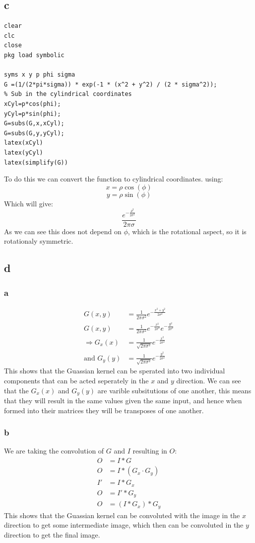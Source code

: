 \documentclass[11pt]{article}
\begin{document}
\subsection{c}
\label{sec:org69b491d}
\begin{verbatim}
clear
clc
close
pkg load symbolic

syms x y p phi sigma
G =(1/(2*pi*sigma)) * exp(-1 * (x^2 + y^2) / (2 * sigma^2));
% Sub in the cylindrical coordinates
xCyl=p*cos(phi);
yCyl=p*sin(phi);
G=subs(G,x,xCyl);
G=subs(G,y,yCyl);
latex(xCyl)
latex(yCyl)
latex(simplify(G))
\end{verbatim}
To do this we can convert the function to cylindrical coordinates. using:
\[x= \rho \cos{\left(\phi \right)}\]
\[y= \rho \sin{\left(\phi \right)}\]
Which will give:
\[\frac{e^{- \frac{\rho^{2}}{2 \sigma^{2}}}}{2 \pi \sigma}\]
As we can see this does not depend on \(\phi\), which is the rotational aspect, so it is rotationaly symmetric.
\subsection{d}
\label{sec:orgdaf4ac1}
\subsubsection{a}
\label{sec:org47fb13f}
\begin{align*}
G(x,y)&=\frac{1}{2\pi \sigma^{2}}e^{-\frac{x^2+y^2}{2 \sigma^2}} \\
G(x,y)&=\frac{1}{2\pi \sigma^{2}}e^{-\frac{x^2}{2 \sigma^2}}e^{-\frac{y^2}{2 \sigma^2}} \\
\Rightarrow G_x(x)&=\frac{1}{\sqrt{2\pi \sigma^{2}}}e^{-\frac{x^2}{2 \sigma^2}} \\
\textrm{and } G_y(y)&=\frac{1}{\sqrt{2\pi \sigma^{2}}}e^{-\frac{y^2}{2 \sigma^2}}
\end{align*}
This shows that the Guassian kernel can be sperated into two individual components that can be acted seperately in the \(x\) and \(y\) direction. We can see that the \(G_x(x)\) and \(G_y(y)\) are varible subsitutions of one another, this means that they will result in the same values given the same input, and hence when formed into their matrices they will be transposes of one another.
\subsubsection{b}
\label{sec:org33a15ad}
We are taking the convolution of \(G\) and \(I\) resulting in \(O\):
\begin{align*}
O&=I*G                     \\
O&=I*(G_x\cdot G_y)        \\
I'&=I*G_x                  \\
O&=I'* G_y                 \\
O&=(I*G_x)*G_y
\end{align*}
This shows that the Guassian kernel can be convoluted with the image in the \(x\) direction to get some intermediate image, which then can be convoluted in the \(y\) direction to get the final image.
\end{document}
